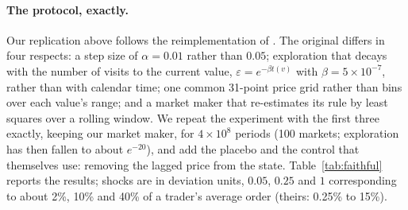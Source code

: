 \paragraph{The \citet{dou2025} protocol, exactly.}
\label{sec:faithful}
Our replication above follows the reimplementation of \citet{esquinas2026}.
The original differs in four respects: a step size of $\alpha=0.01$ rather
than $0.05$; exploration that decays with the number of visits to the
current value, $\varepsilon=e^{-\beta t(v)}$ with $\beta=5\times10^{-7}$,
rather than with calendar time; one common 31-point price grid rather than
bins over each value's range; and a market maker that re-estimates its rule
by least squares over a rolling window. We repeat the experiment with the
first three exactly, keeping our market maker, for $4\times10^8$ periods
(100 markets; exploration has then fallen to about $e^{-20}$), and add the
placebo and the control that \citet{dou2025} themselves use: removing the
lagged price from the state. Table~\ref{tab:faithful} reports the results;
shocks are in deviation units, $0.05$, $0.25$ and $1$ corresponding to about
2\%, 10\% and 40\% of a trader's average order (theirs: 0.25\% to 15\%).

\begin{table}[t]
  \centering
  \caption{The \citet{dou2025} protocol ($\alpha=0.01$, value-specific
  exploration with $\beta=5\times10^{-7}$, common 31-point price grid,
  $\xi=500$, $\sigma_u=0.1$ unless noted; $4\times10^8$ periods, 100 markets).
  $\Delta$ profit is their normalised profitability $\Delta_C$. Shock columns:
  change in per-trader intensity one period after a noise shock of the given
  size in deviation units; rival reaction: change in the rival's intensity one
  period after a forced best-response deviation; both in \% of $\beta^N$;
  95\% CIs.}
  \label{tab:faithful}
  \resizebox{\linewidth}{!}{}
\end{table}

